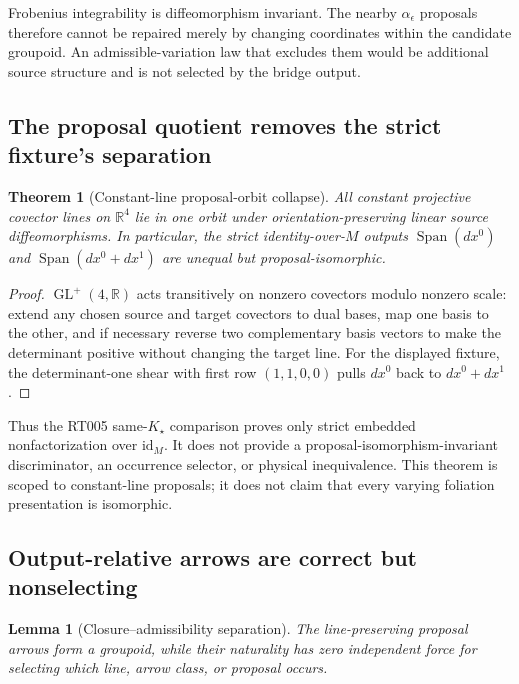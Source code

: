 \documentclass[11pt]{article}
\newtheorem{theorem}{Theorem}
\newtheorem{lemma}{Lemma}
\newcommand{\Span}{\operatorname{Span}}
\newcommand{\GL}{\operatorname{GL}}
\begin{document}
Frobenius integrability is diffeomorphism invariant.  The nearby
$\alpha_\epsilon$ proposals therefore cannot be repaired merely by changing
coordinates within the candidate groupoid.  An admissible-variation law that
excludes them would be additional source structure and is not selected by the
bridge output.

\subsection{The proposal quotient removes the strict fixture's separation}

\begin{theorem}[Constant-line proposal-orbit collapse]
All constant projective covector lines on $\mathbb R^4$ lie in one orbit under
orientation-preserving linear source diffeomorphisms.  In particular, the
strict identity-over-$M$ outputs $\Span(dx^0)$ and
$\Span(dx^0+dx^1)$ are unequal but proposal-isomorphic.
\end{theorem}

\begin{proof}
$\GL^+(4,\mathbb R)$ acts transitively on nonzero covectors modulo nonzero
scale: extend any chosen source and target covectors to dual bases, map one
basis to the other, and if necessary reverse two complementary basis vectors
to make the determinant positive without changing the target line.  For the
displayed fixture, the determinant-one shear with first row $(1,1,0,0)$ pulls
$dx^0$ back to $dx^0+dx^1$.
\end{proof}

Thus the RT005 same-$K_\star$ comparison proves only strict embedded
nonfactorization over $\mathrm{id}_M$.  It does not provide a
proposal-isomorphism-invariant discriminator, an occurrence selector, or
physical inequivalence.  This theorem is scoped to constant-line proposals;
it does not claim that every varying foliation presentation is isomorphic.

\subsection{Output-relative arrows are correct but nonselecting}

\begin{lemma}[Closure--admissibility separation]
The line-preserving proposal arrows form a groupoid, while their naturality
has zero independent force for selecting which line, arrow class, or proposal
occurs.
\end{lemma}
\end{document}

